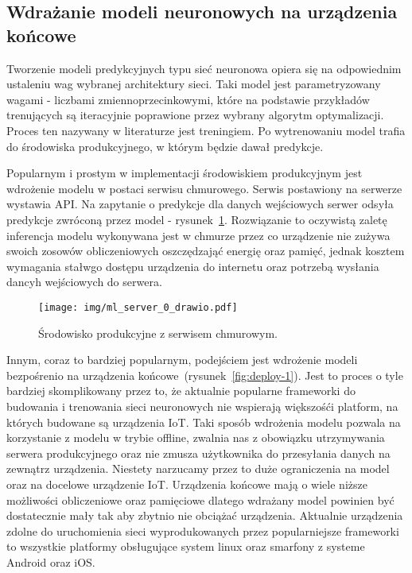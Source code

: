 \subsection{Wdrażanie modeli neuronowych na urządzenia końcowe}

Tworzenie modeli predykcyjnych typu sieć neuronowa opiera się na odpowiednim ustaleniu wag
wybranej architektury sieci. Taki model jest parametryzowany wagami - liczbami
zmiennoprzecinkowymi, które na podstawie przykładów trenujących są iteracyjnie poprawione przez
wybrany algorytm optymalizacji. Proces ten nazywany w literaturze jest treningiem. Po wytrenowaniu model trafia do środowiska produkcyjnego, w którym będzie dawał predykcje.

Popularnym i prostym w implementacji środowiskiem produkcyjnym jest wdrożenie modelu w postaci
serwisu chmurowego. Serwis postawiony na serwerze wystawia API. Na zapytanie o predykcje dla
danych wejściowych serwer odsyła predykcje zwróconą przez model - rysunek~\ref{fig:deploy-0}.
Rozwiązanie to oczywistą zaletę inferencja modelu wykonywana jest w chmurze przez co urządzenie
nie zużywa swoich zosowów obliczeniowych oszczędzająć energię oraz pamięć, jednak kosztem
wymagania stałwgo dostępu urządzenia do internetu oraz potrzebą wysłania dancyh wejściowych do
serwera.

\begin{figure}[h!]\label{fig:deploy-0}
    \centering
    \texttt{[image: img/ml\_server\_0\_drawio.pdf]}
    \caption{Środowisko produkcyjne z serwisem chmurowym.}
    \vspace{-4mm}
\end{figure}

Innym, coraz to bardziej popularnym, podejściem jest wdrożenie modeli bezpośrenio na urządzenia
końcowe~\cite{EdgeFacebook}(rysunek~\ref{fig:deploy-1}). Jest to proces o tyle bardziej skomplikowany przez to, że aktualnie
popularne frameworki\cite{PyTorch,Tensorflow} do budowania i trenowania sieci neuronowych nie
wspierają większośći platform, na których budowane są urządzenia IoT. Taki sposób wdrożenia
modelu pozwala na korzystanie z modelu w trybie offline, zwalnia nas z obowiązku utrzymywania
serwera produkcyjnego oraz nie zmusza użytkownika do przesyłania danych na zewnątrz urządzenia.
Niestety narzucamy przez to duże ograniczenia na model oraz na docelowe urządzenie IoT.
Urządzenia końcowe mają o wiele niższe możliwości obliczeniowe oraz pamięciowe dlatego wdrażany
model powinien być dostatecznie mały tak aby zbytnio nie obciążać urządzenia. Aktualnie
urządzenia zdolne do uruchomienia sieci wyprodukowanych przez popularniejsze frameworki to
wszystkie platformy obsługujące system linux oraz smarfony z systeme Android oraz iOS.

